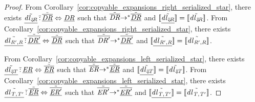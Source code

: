 \documentclass[numbers,10pt,preprint\ifanon ,nocopyrightspace\fi]{sigplanconf}
\begin{document}
\begin{proof}
  From Corollary~\ref{cor:copyable_expansions_right_serialized_star}, there
  exists $\underline{\tilde{\mathit{dl}_{\Downarrow\mkern-4mu \mathit{R}}}}
  \,\tilde{:}\, \underline{\tilde{\overline{\mathit{DR}}}}
  \Leftrightarrow \underline{\mathit{DR}}$ such that $\tilde{\overline{\mathit{DR}}}
  {\rightarrow}^* \underline{\tilde{\overline{\mathit{DR}}}}$ and
  $[ \! [\underline{\tilde{\mathit{dl}_{\Downarrow\mkern-4mu \mathit{R}}}}] \! ] =
  [ \! [\tilde{\mathit{dl}_{\Downarrow\mkern-4mu \mathit{R}}}] \! ]$.
  From Corollary~\ref{cor:copyable_expansions_right_serialized_star}, there
  exists $\underline{\tilde{\mathit{dl}_{\mathit{R}',\mathit{R}}}}
  \,\tilde{:}\, \underline{\tilde{\overline{\mathit{DR}'}}}
  \Leftrightarrow \underline{\tilde{\overline{\mathit{DR}}}}$
  such that $\tilde{\overline{\mathit{DR}'}}
  {\rightarrow}^* \underline{\tilde{\overline{\mathit{DR}'}}}$ and
  $[ \! [\underline{\tilde{\mathit{dl}_{\mathit{R}',\mathit{R}}}}] \! ] =
  [ \! [\tilde{\mathit{dl}_{\mathit{R}',\mathit{R}}}] \! ]$.
  
  From Corollary~\ref{cor:copyable_expansions_left_serialized_star}, there
  exists $\underline{\tilde{\mathit{dl}_{\Downarrow\mkern-4mu \mathit{T}}}}
  \,\tilde{:}\, \underline{\mathit{ER}}
  \Leftrightarrow \underline{\tilde{\overline{\mathit{ER}}}}$ such that
  $\tilde{\overline{\mathit{ER}}}
  {\rightarrow}^* \underline{\tilde{\overline{\mathit{ER}}}}$ and
  $[ \! [\underline{\tilde{\mathit{dl}_{\Downarrow\mkern-4mu \mathit{T}}}}] \! ] =
  [ \! [\tilde{\mathit{dl}_{\Downarrow\mkern-4mu \mathit{T}}}] \! ]$.
  From Corollary~\ref{cor:copyable_expansions_left_serialized_star}, there
  exists $\underline{\tilde{\mathit{dl}_{\mathit{T},\mathit{T}'}}}
  \,\tilde{:}\, \underline{\tilde{\overline{\mathit{ER}}}}
  \Leftrightarrow \underline{\tilde{\overline{\mathit{ER}'}}}$
  such that $\tilde{\overline{\mathit{ER}'}}
  {\rightarrow}^* \underline{\tilde{\overline{\mathit{ER}'}}}$ and
  $[ \! [\underline{\tilde{\mathit{dl}_{\mathit{T},\mathit{T}'}}}] \! ] =
  [ \! [\tilde{\mathit{dl}_{\mathit{T},\mathit{T}'}}] \! ]$.


\end{proof}
\end{document}
